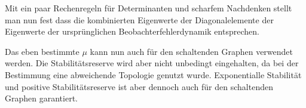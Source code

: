 Mit ein paar Rechenregeln für Determinanten und scharfem Nachdenken stellt man
nun fest dass die kombinierten Eigenwerte der Diagonalelemente der Eigenwerte
der ursprünglichen Beobachterfehlerdynamik entsprechen.

Das eben bestimmte $\mu$ kann nun auch für den schaltenden Graphen verwendet
werden. Die Stabilitätsreserve wird aber nicht unbedingt eingehalten, da bei der
Bestimmung eine abweichende Topologie genutzt wurde.
Exponentialle Stabilität und positive Stabilitätsreserve ist aber dennoch auch
für den schaltenden Graphen garantiert.
